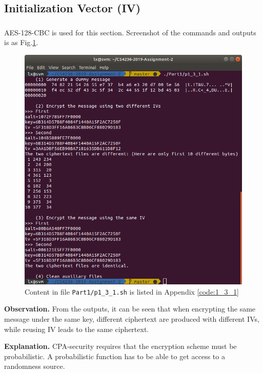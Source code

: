 \subsection{Initialization Vector (IV)}

\subsubsection{}

AES-128-CBC is used for this section. Screenshot of the commands and outputs is as Fig.\ref{fig:p1_3_1}.

\begin{figure}[tb!]
\centering
\includegraphics[width=\columnwidth]{pictures/p1_3_1.png}
\caption{
    Content in file \texttt{Part1/p1\_3\_1.sh} is listed in Appendix \ref{code:1_3_1}
}
\label{fig:p1_3_1}
\end{figure}

\textbf{Observation.}
From the outputs, it can be seen that when encrypting the same message under the same key, different ciphertext are produced with different IVs, while reusing IV leads to the same ciphertext.

\textbf{Explanation.}
CPA-security requires that the encryption scheme must be probabilistic. 
A probabilistic function has to be able to get access to a randomness source.

